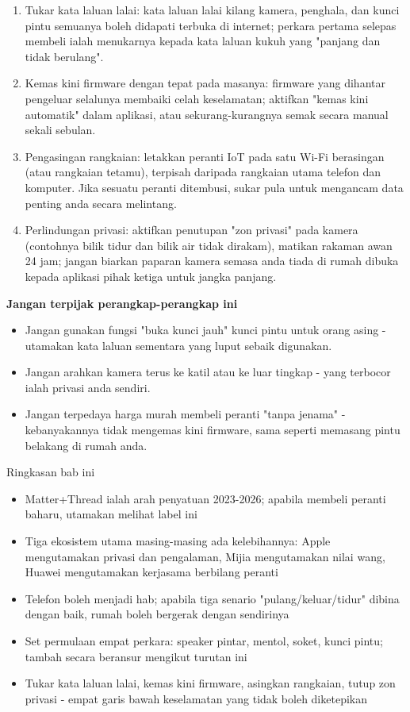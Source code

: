\begin{enumerate}
  \item Tukar kata laluan lalai: kata laluan lalai kilang kamera, penghala, dan kunci pintu semuanya boleh didapati terbuka di internet; perkara pertama selepas membeli ialah menukarnya kepada kata laluan kukuh yang "panjang dan tidak berulang".
  \item Kemas kini firmware dengan tepat pada masanya: firmware yang dihantar pengeluar selalunya membaiki celah keselamatan; aktifkan "kemas kini automatik" dalam aplikasi, atau sekurang-kurangnya semak secara manual sekali sebulan.
  \item Pengasingan rangkaian: letakkan peranti IoT pada satu Wi-Fi berasingan (atau rangkaian tetamu), terpisah daripada rangkaian utama telefon dan komputer. Jika sesuatu peranti ditembusi, sukar pula untuk mengancam data penting anda secara melintang.
  \item Perlindungan privasi: aktifkan penutupan "zon privasi" pada kamera (contohnya bilik tidur dan bilik air tidak dirakam), matikan rakaman awan 24 jam; jangan biarkan paparan kamera semasa anda tiada di rumah dibuka kepada aplikasi pihak ketiga untuk jangka panjang.
\end{enumerate}

\textbf{Jangan terpijak perangkap-perangkap ini}\par

\begin{itemize}
  \item Jangan gunakan fungsi "buka kunci jauh" kunci pintu untuk orang asing - utamakan kata laluan sementara yang luput sebaik digunakan.
  \item Jangan arahkan kamera terus ke katil atau ke luar tingkap - yang terbocor ialah privasi anda sendiri.
  \item Jangan terpedaya harga murah membeli peranti "tanpa jenama" - kebanyakannya tidak mengemas kini firmware, sama seperti memasang pintu belakang di rumah anda.
\end{itemize}

\begin{tcbsummary}{Ringkasan bab ini}
\begin{itemize}
  \item Matter+Thread ialah arah penyatuan 2023-2026; apabila membeli peranti baharu, utamakan melihat label ini
  \item Tiga ekosistem utama masing-masing ada kelebihannya: Apple mengutamakan privasi dan pengalaman, Mijia mengutamakan nilai wang, Huawei mengutamakan kerjasama berbilang peranti
  \item Telefon boleh menjadi hab; apabila tiga senario "pulang/keluar/tidur" dibina dengan baik, rumah boleh bergerak dengan sendirinya
  \item Set permulaan empat perkara: speaker pintar, mentol, soket, kunci pintu; tambah secara beransur mengikut turutan ini
  \item Tukar kata laluan lalai, kemas kini firmware, asingkan rangkaian, tutup zon privasi - empat garis bawah keselamatan yang tidak boleh diketepikan
\end{itemize}

\end{tcbsummary}
